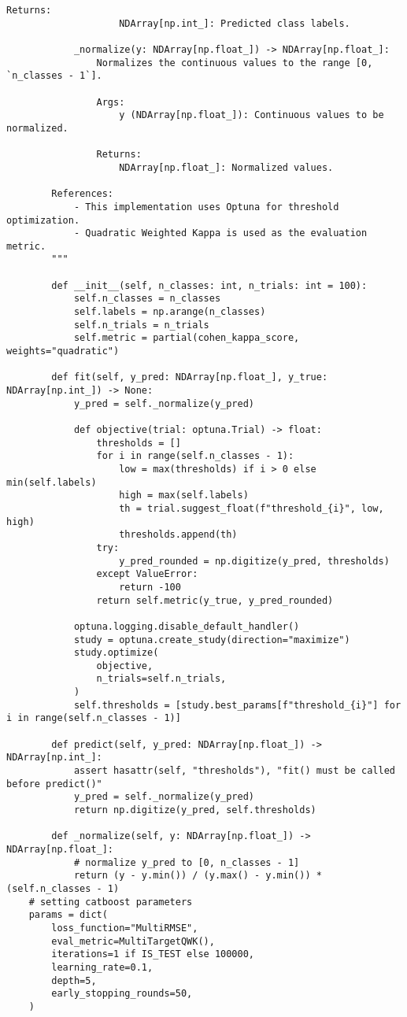 \begin{appendices}
\begin{mdframed}
\begin{lstlisting}[breaklines=true]
                Returns:
                    NDArray[np.int_]: Predicted class labels.

            _normalize(y: NDArray[np.float_]) -> NDArray[np.float_]:
                Normalizes the continuous values to the range [0, `n_classes - 1`].

                Args:
                    y (NDArray[np.float_]): Continuous values to be normalized.

                Returns:
                    NDArray[np.float_]: Normalized values.

        References:
            - This implementation uses Optuna for threshold optimization.
            - Quadratic Weighted Kappa is used as the evaluation metric.
        """

        def __init__(self, n_classes: int, n_trials: int = 100):
            self.n_classes = n_classes
            self.labels = np.arange(n_classes)
            self.n_trials = n_trials
            self.metric = partial(cohen_kappa_score, weights="quadratic")

        def fit(self, y_pred: NDArray[np.float_], y_true: NDArray[np.int_]) -> None:
            y_pred = self._normalize(y_pred)

            def objective(trial: optuna.Trial) -> float:
                thresholds = []
                for i in range(self.n_classes - 1):
                    low = max(thresholds) if i > 0 else min(self.labels)
                    high = max(self.labels)
                    th = trial.suggest_float(f"threshold_{i}", low, high)
                    thresholds.append(th)
                try:
                    y_pred_rounded = np.digitize(y_pred, thresholds)
                except ValueError:
                    return -100
                return self.metric(y_true, y_pred_rounded)

            optuna.logging.disable_default_handler()
            study = optuna.create_study(direction="maximize")
            study.optimize(
                objective,
                n_trials=self.n_trials,
            )
            self.thresholds = [study.best_params[f"threshold_{i}"] for i in range(self.n_classes - 1)]

        def predict(self, y_pred: NDArray[np.float_]) -> NDArray[np.int_]:
            assert hasattr(self, "thresholds"), "fit() must be called before predict()"
            y_pred = self._normalize(y_pred)
            return np.digitize(y_pred, self.thresholds)

        def _normalize(self, y: NDArray[np.float_]) -> NDArray[np.float_]:
            # normalize y_pred to [0, n_classes - 1]
            return (y - y.min()) / (y.max() - y.min()) * (self.n_classes - 1)
    # setting catboost parameters
    params = dict(
        loss_function="MultiRMSE",
        eval_metric=MultiTargetQWK(),
        iterations=1 if IS_TEST else 100000,
        learning_rate=0.1,
        depth=5,
        early_stopping_rounds=50,
    )


\end{lstlisting}
\end{mdframed}
\end{appendices}
